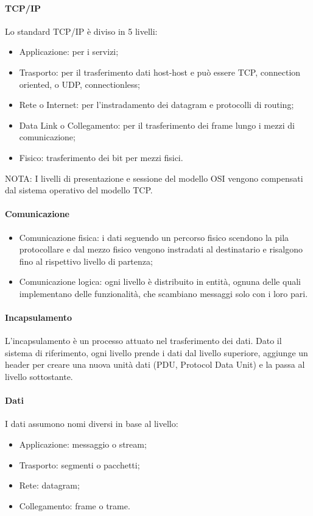 \documentclass{subfiles}
\begin{document}
    \paragraph{TCP/IP}
    Lo standard TCP/IP è diviso in 5 livelli:
    \begin{itemize}
        \item Applicazione: per i servizi;
        \item Trasporto: per il trasferimento dati host-host e può essere TCP, connection oriented, o UDP, connectionless;
        \item Rete o Internet: per l'instradamento dei datagram e protocolli di routing;
        \item Data Link o Collegamento: per il trasferimento dei frame lungo i mezzi di comunicazione;
        \item Fisico: trasferimento dei bit per mezzi fisici.
    \end{itemize}
    NOTA: I livelli di presentazione e sessione del modello OSI vengono compensati dal sistema operativo del modello TCP.
    \lineskip
    \lineskip
    \paragraph{Comunicazione}
    \begin{itemize}
        \item Comunicazione fisica: i dati seguendo un percorso fisico scendono la pila protocollare e dal mezzo fisico vengono 
        instradati al destinatario e risalgono fino al rispettivo livello di partenza;
        \item Comunicazione logica: ogni livello è distribuito in entità, ognuna delle quali implementano delle funzionalità, che 
        scambiano messaggi solo con i loro pari.
    \end{itemize}
    
    \paragraph{Incapsulamento}
    L'incapsulamento è un processo attuato nel trasferimento dei dati. Dato il sistema di riferimento, ogni livello prende i dati dal 
    livello superiore, aggiunge un header per creare una nuova unità dati (PDU, Protocol Data Unit) e la passa al livello sottostante.
    
    \paragraph{Dati}
    I dati assumono nomi diversi in base al livello:
    \begin{itemize}
        \item Applicazione: messaggio o stream;
        \item Trasporto: segmenti o pacchetti;
        \item Rete: datagram;
        \item Collegamento: frame o trame.
    \end{itemize}
\end{document}
